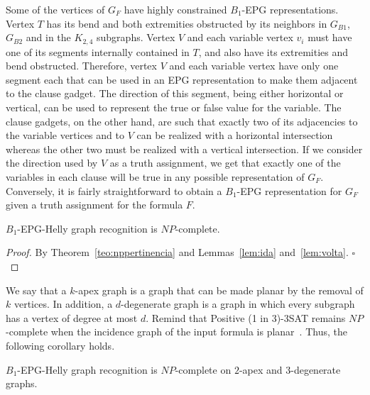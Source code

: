 \documentclass[runningheads]{llncs}
\begin{document}
Some of the vertices of $G_F$ have highly constrained $B_1$-EPG representations. Vertex $T$ has its bend	and both extremities	obstructed	by its neighbors in	$G_{B1}$, $G_{B2}$ and in the $K_{2,4}$
subgraphs. Vertex $V$ and each variable vertex $v_i$ must have one of its segments internally contained in $T$, and also have its extremities and bend obstructed.  Therefore, vertex $V$ and each
variable vertex have only one segment each that can be used in an EPG
representation to make them adjacent to the clause gadget. The direction of
this segment, being either horizontal	or vertical, can be used to represent
the true or false value	for the	variable.
The clause gadgets, on the other hand, are such that exactly two of its
adjacencies to the variable vertices and to $V$ can be realized with a
horizontal intersection whereas  the other two must be realized with a
vertical intersection. If we consider the direction used by $V$ as a
truth assignment, we get that exactly one of the variables in each clause
will be	true in	any possible representation of $G_F$. Conversely, it is	fairly
straightforward to obtain a $B_1$-EPG representation for $G_F$ given a truth assignment	for
the formula $F$.

\begin{theorem}
{\sc $B_{1}$-EPG-Helly graph recognition} is $NP$-complete.
\end{theorem}
\begin{proof} %
By Theorem~\ref{teo:nppertinencia} and Lemmas~\ref{lem:ida} and~\ref{lem:volta}.
$\square$ \end{proof}

We say that a $k$-apex graph is a graph that can be made planar by the removal of $k$ vertices. In addition, a $d$-degenerate graph is a graph in which every subgraph has a vertex of degree at most $d$. Remind that {\sc Positive (1 in 3)-3SAT} remains $NP$-complete when the incidence graph of the input formula is planar~\cite{mulzer2008minimum}. Thus, the following corollary holds.

\begin{corollary}\label{coro:2apexAnd3degenerate}
{\sc $B_{1}$-EPG-Helly graph recognition} is $NP$-complete on $2$-apex and $3$-degenerate graphs.
\end{corollary}

\vspace{-0.3cm}




\end{document}
